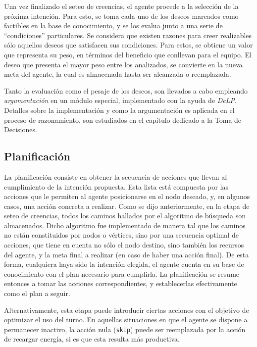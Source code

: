 \documentclass[oneside]{book}
\begin{document}
\label{sec:argumentacion}

Una vez finalizado el seteo de creencias, el agente procede a la selección de la próxima 
intención. Para esto, se toma cada uno de los deseos marcados como factibles en la base 
de conocimiento, y se los evalua junto a una serie de ``condiciones'' particulares. Se 
considera que existen razones para creer realizables sólo aquellos deseos que satisfacen 
sus condiciones. Para estos, se obtiene un valor que representa su peso, en términos del 
beneficio que conllevan para el equipo. El deseo que presenta el mayor peso entre los 
analizados, se convierte en la nueva meta del agente, la cual es almacenada hasta ser 
alcanzada o reemplazada.

Tanto la evaluación como el pesaje de los deseos, son llevados a cabo empleando \textit{argumentación} 
en un módulo especial, implementado con la ayuda de \textit{DeLP}. 
Detalles sobre la implementación y como la argumentación es aplicada en el proceso de 
razonamiento, son estudiados en el capítulo dedicado a la Toma de Decisiones. %

\subsection{Planificación}


La planificación consiste en obtener la secuencia de acciones que llevan al cumplimiento 
de la intención propuesta. Esta lista está compuesta por las acciones que le permiten al 
agente posicionarse en el nodo deseado, y, en algunos casos, una acción concreta a realizar. 
Como se dijo anteriormente, en la etapa de seteo de creencias, todos los caminos hallados 
por el algoritmo de búsqueda son almacenados. Dicho algoritmo fue implementado de manera 
tal que los caminos no están constituidos por nodos o vértices, sino por una secuencia 
optimal de acciones, que tiene en cuenta no sólo el nodo destino, sino también los recursos 
del agente, y la meta final a realizar (en caso de haber una acción final). De esta forma, 
cualquiera haya sido la intención elegida, el agente cuenta en su base de conocimiento 
con el plan necesario para cumplirla. La planificación se resume entonces a tomar las 
acciones correspondientes, y establecerlas efectivamente como el plan a seguir.

Alternativamente, esta etapa puede introducir ciertas acciones con el objetivo de optimizar 
el uso del turno. En aquellas situaciones en que el agente se dispone a permanecer inactivo, 
la acción nula (\texttt{skip}) puede ser reemplazada por la acción de recargar energía, si es que 
esta resulta más productiva.
\end{document}
